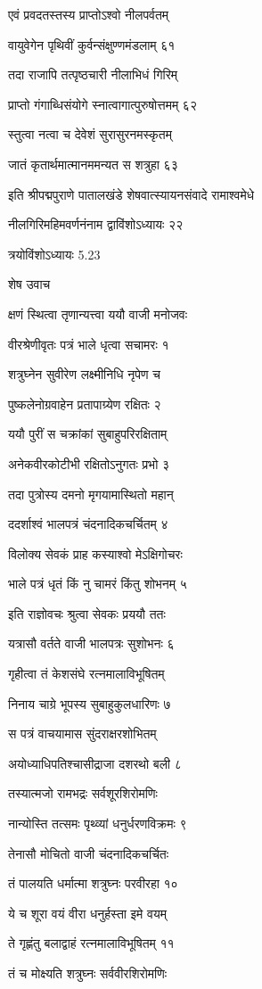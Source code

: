 एवं प्रवदतस्तस्य प्राप्तोऽश्वो नीलपर्वतम्

वायुवेगेन पृथिवीं कुर्वन्संक्षुण्णमंडलाम् ६१

तदा राजापि तत्पृष्ठचारी नीलाभिधं गिरिम्

प्राप्तो गंगाब्धिसंयोगे स्नात्वागात्पुरुषोत्तमम् ६२

स्तुत्वा नत्वा च देवेशं सुरासुरनमस्कृतम्

जातं कृतार्थमात्मानममन्यत स शत्रुहा ६३

इति श्रीपद्मपुराणे पातालखंडे शेषवात्स्यायनसंवादे रामाश्वमेधे

नीलगिरिमहिमवर्णनंनाम द्वाविंशोऽध्यायः २२

त्रयोविंशोऽध्यायः 5.23

शेष उवाच

क्षणं स्थित्वा तृणान्यत्त्वा ययौ वाजी मनोजवः

वीरश्रेणीवृतः पत्रं भाले धृत्वा सचामरः १

शत्रुघ्नेन सुवीरेण लक्ष्मीनिधि नृपेण च

पुष्कलेनोग्रवाहेन प्रतापाग्र्येण रक्षितः २

ययौ पुरीं स चक्रांकां सुबाहुपरिरक्षिताम्

अनेकवीरकोटीभी रक्षितोऽनुगतः प्रभो ३

तदा पुत्रोस्य दमनो मृगयामास्थितो महान्

ददर्शाश्वं भालपत्रं चंदनादिकचर्चितम् ४

विलोक्य सेवकं प्राह कस्याश्वो मेऽक्षिगोचरः

भाले पत्रं धृतं किं नु चामरं किंतु शोभनम् ५

इति राज्ञोवचः श्रुत्वा सेवकः प्रययौ ततः

यत्रासौ वर्तते वाजी भालपत्रः सुशोभनः ६

गृहीत्वा तं केशसंघे रत्नमालाविभूषितम्

निनाय चाग्रे भूपस्य सुबाहुकुलधारिणः ७

स पत्रं वाचयामास सुंदराक्षरशोभितम्

अयोध्याधिपतिश्चासीद्राजा दशरथो बली ८

तस्यात्मजो रामभद्रः सर्वशूरशिरोमणिः

नान्योस्ति तत्समः पृथ्व्यां धनुर्धरणविक्रमः ९

तेनासौ मोचितो वाजी चंदनादिकचर्चितः

तं पालयति धर्मात्मा शत्रुघ्नः परवीरहा १०

ये च शूरा वयं वीरा धनुर्हस्ता इमे वयम्

ते गृह्णंतु बलाद्वाहं रत्नमालाविभूषितम् ११

तं च मोक्ष्यति शत्रुघ्नः सर्ववीरशिरोमणिः

